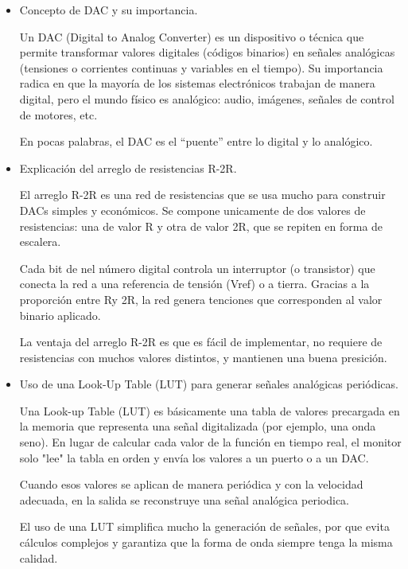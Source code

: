 \begin{itemize}
    \item Concepto de DAC y su importancia.\vspace{0.5em}
    
    \hspace{2em}Un DAC (Digital to Analog Converter) es un dispositivo o técnica que permite transformar valores digitales (códigos binarios) en señales analógicas (tensiones o corrientes continuas y variables en el tiempo). Su importancia radica en que la mayoría de los sistemas electrónicos trabajan de manera digital, pero el mundo físico es analógico: audio, imágenes, señales de control de motores, etc.
    
    \hspace{2em}En pocas palabras, el DAC es el “puente” entre lo digital y lo analógico.\vspace{1em}

    \item Explicación del arreglo de resistencias R-2R.\vspace{0.5em}

    \hspace{2em}El arreglo R-2R es una red de resistencias que se usa mucho para construir DACs simples y económicos. Se compone unicamente de dos valores de resistencias: una de valor R y otra de valor 2R, que se repiten en forma de escalera.
    
    \hspace{2em}Cada bit de nel número digital controla un interruptor (o transistor) que conecta la red a una referencia de tensión (Vref) o a tierra. Gracias a la proporción entre Ry 2R, la red genera tenciones que corresponden al valor binario aplicado.
    
    \hspace{2em}La ventaja del arreglo R-2R es que es fácil de implementar, no requiere de resistencias con muchos valores distintos, y mantienen una buena presición.\vspace{1em}
    
    \item Uso de una Look-Up Table (LUT) para generar señales analógicas periódicas.\vspace{0.5em}
    
    \hspace{2em}Una Look-up Table (LUT) es básicamente una tabla de valores precargada en la memoria que representa una señal digitalizada (por ejemplo, una onda seno). En lugar de calcular cada valor de la función en tiempo real, el monitor solo "lee" la tabla en orden y envía los valores a un puerto o a un DAC.
    
    \hspace{2em}Cuando esos valores se aplican de manera periódica y con la velocidad adecuada, en la salida se reconstruye una señal analógica periodica.
    
    El uso de una LUT simplifica mucho la generación de señales, por que evita cálculos complejos y garantiza que la forma de onda siempre tenga la misma calidad.\vspace{1em}
\end{itemize}


